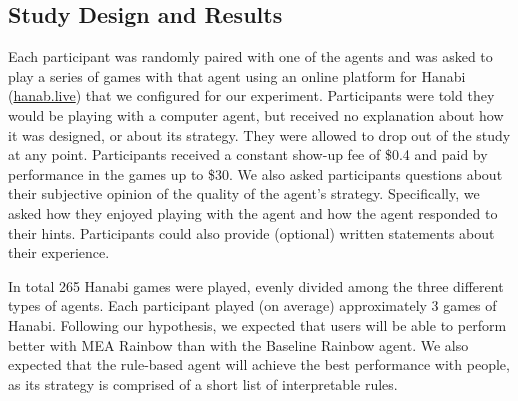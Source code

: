 \documentclass[letterpaper]{article} %
\begin{document}
\subsection{Study Design and Results}
Each participant was randomly paired with one of the agents and was asked to play a series of games with that agent  using an online  platform for Hanabi (\url{hanab.live}) that we configured for our experiment.  Participants were told they would be playing with a computer agent, but  received no explanation about how it was designed, or about its strategy. They were allowed to drop out of the study at any point. Participants received a constant show-up fee of \$0.4 and paid by performance in the games up to \$30.  %
We also asked participants  questions about their subjective opinion of the quality of the agent's strategy. Specifically, we asked  how they enjoyed playing with the agent and how the agent responded to their hints. Participants could also provide (optional) written statements about their experience.


In total 265 Hanabi games were played,  evenly divided among the three different types of agents.
Each participant played (on average) approximately 3 games of Hanabi.
Following our hypothesis, we  expected that users will be able to perform better with MEA Rainbow than with the Baseline Rainbow agent. We also expected that the rule-based agent will achieve the best performance with people,  as its strategy is comprised of a short list of   interpretable rules.
\end{document}
